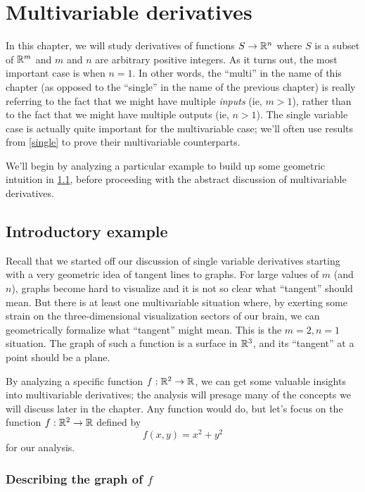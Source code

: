 \chapter{Multivariable derivatives} \label{multi}

In this chapter, we will study derivatives of functions $S \to \mathbb{R}^n$ where $S$ is a subset of $\mathbb{R}^m$ and $m$ and $n$ are arbitrary positive integers. As it turns out, the most important case is when $n = 1$. In other words, the ``multi'' in the name of this chapter (as opposed to the ``single'' in the name of the previous chapter) is really referring to the fact that we might have multiple \emph{inputs} (ie, $m > 1$), rather than to the fact that we might have multiple outputs (ie, $n > 1$). The single variable case is actually quite important for the multivariable case; we'll often use results from \cref{single} to prove their multivariable counterparts. 

We'll begin by analyzing a particular example to build up some geometric intuition in \cref{multi-introductory-example}, before proceeding with the abstract discussion of multivariable derivatives. 

\section{Introductory example} \label{multi-introductory-example}

Recall that we started off our discussion of single variable derivatives starting with a very geometric idea of tangent lines to graphs. For large values of $m$ (and $n$), graphs become hard to visualize and it is not so clear what ``tangent'' should mean. But there is at least one multivariable situation where, by exerting some strain on the three-dimensional visualization sectors of our brain, we can geometrically formalize what ``tangent'' might mean. This is the $m = 2, n = 1$ situation. The graph of such a function is a surface in $\mathbb{R}^3$, and its ``tangent'' at a point should be a plane.  

By analyzing a specific function $f : \mathbb{R}^2 \to \mathbb{R}$,  we can get some valuable insights into multivariable derivatives; the analysis will presage many of the concepts we will discuss later in the chapter. Any function would do, but let's focus on the function $f : \mathbb{R}^2 \to \mathbb{R}$ defined by
\[ f(x, y) = x^2 + y^2 \]
for our analysis.  

\subsection*{Describing the graph of \texorpdfstring{$f$}{f}}

